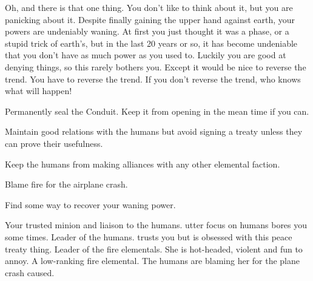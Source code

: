 \documentclass[char]{elementals}
\begin{document}
Oh, and there is that one thing. You don't like to think about it, but you are panicking about it. Despite finally gaining the upper hand against earth, your powers are undeniably waning. At first you just thought it was a phase, or a stupid trick of earth's, but in the last 20 years or so, it has become undeniable that you don't have as much power as you used to. Luckily you are good at denying things, so this rarely bothers you. Except it would be nice to reverse the trend. You have to reverse the trend. If you don't reverse the trend, who knows what will happen!

\begin{itemz}[Goals]
	\item  Permanently seal the Conduit. Keep it from opening in the mean time if you can.
	\item  Maintain good relations with the humans but avoid signing a treaty unless they can prove their usefulness.
	\item  Keep the humans from making alliances with any other elemental faction.
	\item  Blame fire for the airplane crash.
	\item  Find some way to recover your waning power.
\end{itemz}

\begin{contacts}
	\contact{\cNaturalist{\intro}} Your trusted minion and liaison to the humans. \cNaturalist{\Their} utter focus on humans bores you some times.
	\contact{\cLeader{\intro}} Leader of the humans. \cLeader{\They} trusts you but is obsessed with this peace treaty thing.
	\contact{\cQueen{\intro}} Leader of the fire elementals. She is hot-headed, violent and fun to annoy.
  \contact{\cJuliet{\intro}} A low-ranking fire elemental. The humans are blaming her for the plane crash \cNaturalist{} caused.
\end{contacts} 
\end{document}
